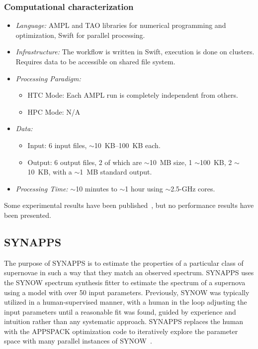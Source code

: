 \documentclass[10pt,letterpaper]{article}
\begin{document}
\subsubsection{Computational characterization}
\begin {itemize}
\item {\em Language:} AMPL and TAO libraries for numerical programming and optimization, Swift for parallel processing.
\item {\em Infrastructure:} The workflow is written in Swift, execution is done  on clusters.  Requires data to be accessible on shared file system.
\item {\em Processing Paradigm:}
  \begin{itemize}
  \item HTC Mode: Each AMPL run is completely independent from others.
  \item HPC Mode: N/A
  \end{itemize}

\item {\em Data:}
  \begin{itemize}
  \item Input: 6 input files, $\sim$10~KB--100~KB each.
  \item Output: 6 output files, 2 of which are $\sim$10~MB size, 1 $\sim$100~KB, 2 $\sim$10~KB, with a $\sim$1~MB standard output.
  \end{itemize}

\item {\em Processing Time:} $\sim$10 minutes to $\sim$1 hour using $\sim$2.5-GHz cores.
\end{itemize}

Some experimental results have been published~\cite{CIM-EARTH-10}, but no performance results have been presented.


\subsection{SYNAPPS}

The purpose of SYNAPPS is to estimate the properties of a particular class of supernovae in such
a way that they match an observed spectrum. SYNAPPS uses the SYNOW spectrum synthesis fitter to
estimate the spectrum of a supernova using a model with over 50 input parameters.  Previously,
SYNOW was typically utilized in a human-supervised manner, with a human in the loop adjusting
the input
parameters until a reasonable fit was found, guided by experience and intuition rather than
any systematic approach.  SYNAPPS replaces the human with the APPSPACK optimization code to
iteratively explore the parameter space with many parallel instances of SYNOW~\cite{nugent-synapps-08}.
\end{document}
